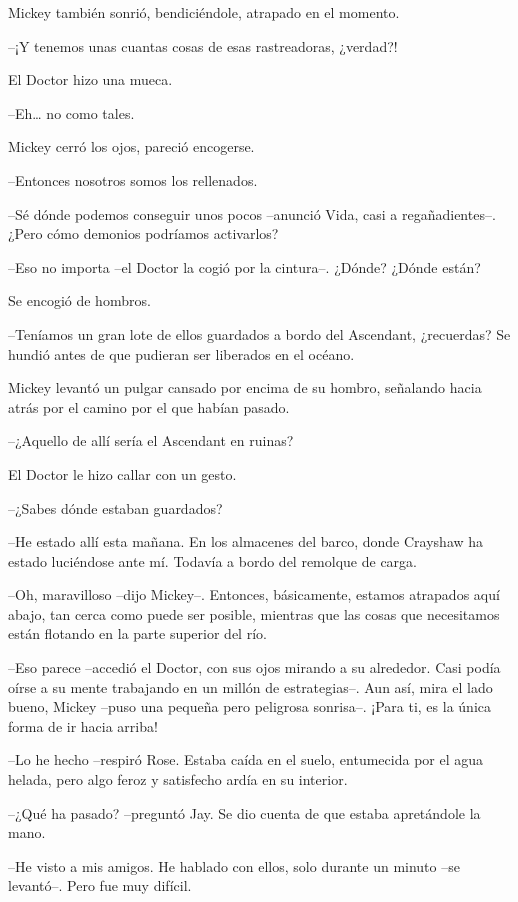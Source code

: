 {Mickey también sonrió, bendiciéndole, atrapado en el momento.}

{--¡Y tenemos unas cuantas cosas de esas rastreadoras, ¿verdad?!}

{El Doctor hizo una mueca.}

{--Eh\ldots{} no como tales.}

{Mickey cerró los ojos, pareció encogerse.}

{--Entonces nosotros somos los rellenados.}

{--Sé dónde podemos conseguir unos pocos --anunció Vida, casi a
regañadientes--. ¿Pero cómo demonios podríamos activarlos?}

{--Eso no importa --el Doctor la cogió por la cintura--. ¿Dónde? ¿Dónde
están?}

{Se encogió de hombros.}

{--Teníamos un gran lote de ellos guardados a bordo del Ascendant,
¿recuerdas? Se hundió antes de que pudieran ser liberados en el océano.}

{Mickey levantó un pulgar cansado por encima de su hombro, señalando
hacia atrás por el camino por el que habían pasado.}

{--¿Aquello de allí sería el Ascendant en ruinas?}

{El Doctor le hizo callar con un gesto.}

{--¿Sabes dónde estaban guardados?}

{--He estado allí esta mañana. En los almacenes del barco, donde
 Crayshaw ha estado luciéndose ante mí. Todavía a bordo del remolque de
carga.}

{--Oh, maravilloso --dijo Mickey--. Entonces, básicamente, estamos
 atrapados aquí abajo, tan cerca como puede ser posible, mientras que las
cosas que necesitamos están flotando en la parte superior del río.}

{--Eso parece --accedió el Doctor, con sus ojos mirando a su alrededor.
 Casi podía oírse a su mente trabajando en un millón de estrategias--.
 Aun así, mira el lado bueno, Mickey --puso una pequeña pero peligrosa
sonrisa--. ¡Para ti, es la única forma de ir hacia arriba!}

\mbox{}

{--Lo he hecho --respiró Rose. Estaba caída en el suelo, entumecida por
el agua helada, pero algo feroz y satisfecho ardía en su interior.}

{--¿Qué ha pasado? --preguntó Jay. Se dio cuenta de que estaba
apretándole la mano.}

{--He visto a mis amigos. He hablado con ellos, solo durante un minuto
--se levantó--. Pero fue muy difícil.}

